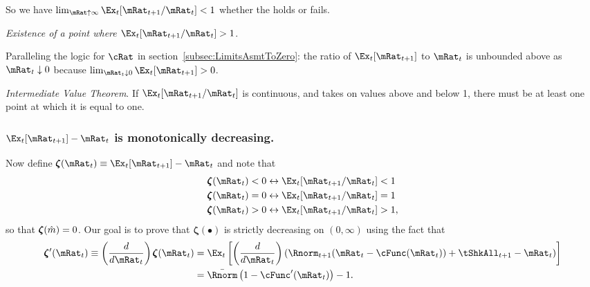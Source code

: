 \documentclass[\econtexRoot/BufferStockTheory]{subfiles}
\begin{document}
So we have $\lim_{\mRat \uparrow \infty} \Ex_{t}[\mRat_{t+1}/\mRat_{t}] < 1$ whether the {\RIC} holds or fails.

\medskip\medskip

\noindent \textit{Existence of a point where $\Ex_t [{\mRat}_{t+1}/\mRat_t] > 1$}.

Paralleling the logic for $\cRat$ in section~\ref{subsec:LimitsAsmtToZero}: the ratio of $\Ex_{t}[\mRat_{t+1}]$ to $\mRat_{t}$ is unbounded above as $\mRat_{t} \downarrow 0$ because $\lim_{\mRat_{t}\downarrow 0} \Ex_{t}[\mRat_{t+1}] > 0$.

\medskip\medskip

\noindent \textit{Intermediate Value Theorem}.  If $\Ex_t [{\mRat}_{t+1}/\mRat_t]$ is continuous, and takes on values above and below 1, there must be at least one point at which it is equal to one.

\subsubsection{$\Ex_t [{\mRat}_{t+1}] -\mRat_t$ is monotonically decreasing.}

Now define \providecommand{\difFunc}{\pmb{\zeta}} $\difFunc(\mRat_t) \equiv 
\Ex_t[\mRat_{t+1}] - \mRat_t$ and note that
\begin{equation}\begin{gathered}\begin{aligned}\label{eq:difRatioEquiv}
  \difFunc(\mRat_t) < 0 &\leftrightarrow \Ex_t[{\mRat}_{t+1}/\mRat_t] < 1 
                          \nonumber\\
  \difFunc(\mRat_t) = 0 &\leftrightarrow \Ex_t[{\mRat}_{t+1}/\mRat_t] = 1\\
  \difFunc(\mRat_t) > 0 &\leftrightarrow \Ex_t[{\mRat}_{t+1}/\mRat_t] > 
                          1,\nonumber
\end{aligned}\end{gathered}\end{equation}
so that $\difFunc(\mTrg)=0$. Our goal is to prove that $\difFunc(\bullet)$ is strictly 
decreasing on $(0,\infty)$ using the fact that
\begin{equation}\begin{gathered}\begin{aligned}
  \difFunc^{\prime}(\mRat_{t}) \equiv  \left( \frac{d}{d\mRat_{t}}\right) \difFunc(\mRat_t)  & = \Ex_{t}\left[
                                                                                               \left( \frac{d}{d\mRat_{t}}\right) \left( 
                                                                                               {\Rnorm}_{t+1}(\mRat_{t}-\cFunc(\mRat_{t}))+%
                                                                                               {\tShkAll}_{t+1} - {\mRat}_t\right) \right] \label{eq:difFuncDecreases} \\
                                                                                             & = \bar{\Rnorm}\left(1-\cFunc^{\prime}({\mRat}_t)\right) - 1.  \notag
\end{aligned}\end{gathered}\end{equation}
\end{document}
